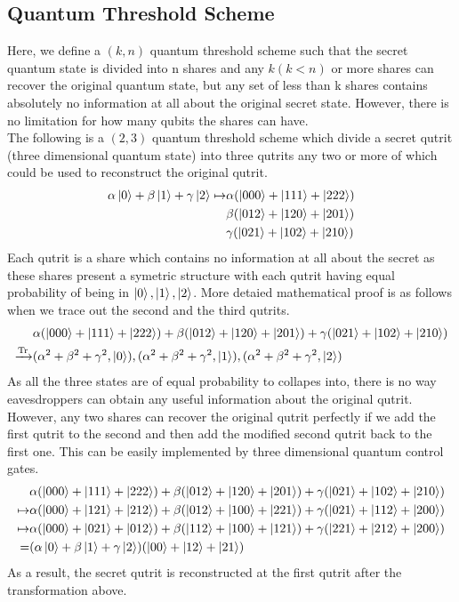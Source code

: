 \documentclass[12pt]{article}
\begin{document}
\subsection{Quantum Threshold Scheme}
Here, we define a $(k,n)$ quantum threshold scheme such that the secret quantum state is divided into n shares and any $k (k < n)$ or more shares can recover the original quantum state, but any set of less than k shares contains absolutely no information at all about the original secret state.
However, there is no limitation for how many qubits the shares can have.
\\
The following is a $(2,3)$ quantum threshold scheme which divide a secret qutrit (three dimensional quantum state) into three qutrits any two or more of which could be used to reconstruct the original qutrit.
\begin{align}
	\alpha \ket{0} + \beta \ket{1} + \gamma \ket{2} \mapsto
	& \alpha ( \ket{000} + \ket{111} + \ket{222} ) \nonumber \\
	& \beta  ( \ket{012} + \ket{120} + \ket{201} ) \nonumber \\
	& \gamma ( \ket{021} + \ket{102} + \ket{210} ) 
\end{align}
Each qutrit is a share which contains no information at all about the secret as these shares present a symetric structure with each qutrit having equal probability of being in $ \ket{0}, \ket{1}, \ket{2} $. More detaied mathematical proof is as follows when we trace out the second and the third qutrits.
\begin{align}
	& \alpha ( \ket{000} + \ket{111} + \ket{222} ) +
	\beta  ( \ket{012} + \ket{120} + \ket{201} ) + 
	\gamma ( \ket{021} + \ket{102} + \ket{210} )  \nonumber \\ 
	\xrightarrow{ \Tr}
	& (\alpha ^2 + \beta ^2 + \gamma ^2, \ket{0}), 
	(\alpha ^2 + \beta ^2 + \gamma ^2, \ket{1}),
	(\alpha ^2 + \beta ^2 + \gamma ^2, \ket{2}) 
\end{align}
As all the three states are of equal probability to collapes into, 
there is no way eavesdroppers can obtain any useful information about the original qutrit.
However, any two shares can recover the original qutrit perfectly if we add the first qutrit to the second and then add the modified second qutrit back to the first one. This can be easily implemented by three dimensional quantum control gates.
\begin{align}
	& \alpha ( \ket{000} + \ket{111} + \ket{222} ) +
	\beta  ( \ket{012} + \ket{120} + \ket{201} ) + 
	\gamma ( \ket{021} + \ket{102} + \ket{210} ) \nonumber \\ 
	\mapsto 
	& \alpha ( \ket{000} + \ket{121} + \ket{212} ) +
	\beta  ( \ket{012} + \ket{100} + \ket{221} ) + 
	\gamma ( \ket{021} + \ket{112} + \ket{200} ) \nonumber \\ 
	\mapsto
	& \alpha ( \ket{000} + \ket{021} + \ket{012} ) +
	\beta  ( \ket{112} + \ket{100} + \ket{121} ) + 
	\gamma ( \ket{221} + \ket{212} + \ket{200} ) \nonumber \\ 
	=
	& ( \alpha \ket{0} + \beta \ket{1} + \gamma \ket{2})
	(\ket{00} + \ket{12} + \ket{21})
\end{align}
As a result, the secret qutrit is reconstructed at the first qutrit after the transformation above.
\end{document}
